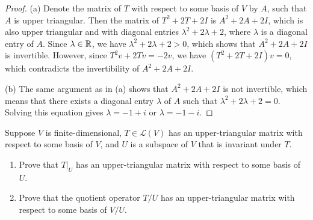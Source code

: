\documentclass{article}
\begin{document}
\begin{proof}
  (a) Denote the matrix of \( T \) with respect to some basis of \( V \) by \( A \), such that \( A \) is upper triangular. Then the matrix of \( T^2+2T+2I \) is \( A^2+2A+2I \), which is also upper triangular and with diagonal entries \( \lambda^2+2\lambda+2 \), where \( \lambda \) is a diagonal entry of \( A \). Since \( \lambda\in\mathbb{R} \), we have \( \lambda^2+2\lambda+2>0 \), which shows that \( A^2+2A+2I \) is invertible. However, since \( T^2v + 2Tv = -2v \), we have \( (T^2+2T+2I)v = 0 \), which contradicts the invertibility of \( A^2+2A+2I \).\par
  (b) The same argument as in (a) shows that \( A^2+2A+2I \) is not invertible, which means that there exists a diagonal entry \( \lambda \) of \( A \) such that \( \lambda^2+2\lambda+2=0 \). Solving this equation gives \( \lambda = -1 + i \) or \( \lambda = -1 - i \).
\end{proof}



\begin{problem}[5C-12]
Suppose $V$ is finite-dimensional, $T \in \mathcal{L}(V)$ has an upper-triangular matrix with respect to some basis of $V$, and $U$ is a subspace of $V$ that is invariant under $T$.
\begin{enumerate}[label=(\alph*)]
\item Prove that $T|_U$ has an upper-triangular matrix with respect to some basis of $U$.
\item Prove that the quotient operator $T/U$ has an upper-triangular matrix with respect to some basis of $V/U$.
\end{enumerate}
\end{problem}
\end{document}
